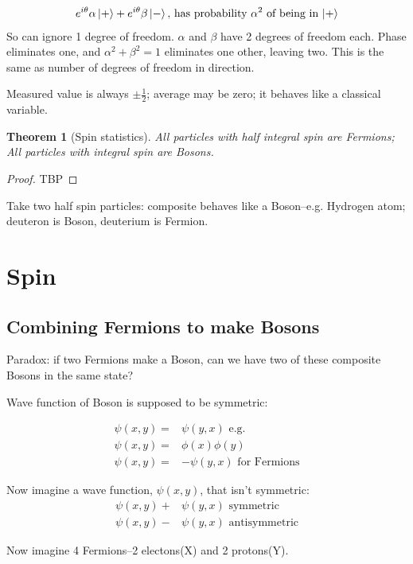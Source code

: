 \documentclass[]{article}
\newtheorem{thm}{Theorem}
\begin{document}
\begin{align*}
e^{i\theta} \alpha \ket{+} + e^{i\theta}\beta \ket{-} \text{, has probability $\alpha^2$ of being in $\ket{+}$}
\end{align*}
So can ignore 1 degree of freedom. $\alpha$ and $\beta$ have 2 degrees of freedom each. Phase eliminates one, and $\alpha^2+\beta^2=1$ eliminates one other, leaving two. This is the same as number of degrees of freedom in direction.

Measured value is always $\pm \frac{1}{2}$; average may be zero; it behaves like a classical variable.

\begin{thm}[Spin statistics]
		All particles with half integral spin are Fermions;
		All particles with  integral spin are Bosons.
\end{thm}

\begin{proof}
	TBP
\end{proof}
Take two half spin particles: composite behaves like a Boson--e.g. Hydrogen atom; deuteron is Boson, deuterium is Fermion.


\section{Spin}

\subsection{Combining Fermions to make Bosons}

Paradox: if two Fermions make a Boson, can we have two of these composite Bosons in the same state?

Wave function of Boson is supposed to be symmetric:

\begin{align*}
	\psi(x,y) =&\psi(y,x) \text{ e.g. }\\
	\psi(x,y) =& \phi(x)\phi(y)\\
	\psi(x,y) =&-\psi(y,x) \text{ for Fermions}
\end{align*}

Now imagine a wave function, $\psi(x,y)$, that isn't symmetric:
\begin{align*}
\psi(x,y)+& \psi(y,x) \text{ symmetric}\\
\psi(x,y)-& \psi(y,x) \text{ antisymmetric}
\end{align*}

Now imagine 4 Fermions--2 electons(X) and 2 protons(Y).
\end{document}
